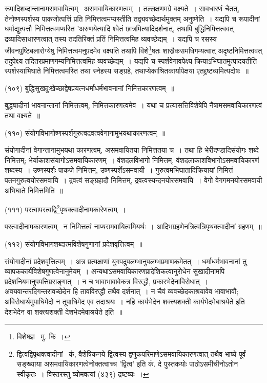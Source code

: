 \documentclass[11pt, openany]{book}
\begin{document}
{रूपादिशब्दान्तानामसमवायित्वम् \textendash\ असमवायिकारणत्वम्~। तल्लक्षणमग्रे वक्ष्यते~। सावधारणं चैतत्, तेनोष्णस्पर्शस्य पाकजोत्पत्तिं प्रति निमित्तत्वमप्यस्तीति तद्व्यवच्छेदार्थमुक्तम् अनुष्णेति~। यद्यपि च रूपादीनां धर्माद्युत्पत्तौ निमित्तत्वमप्यस्ति 'अरुणयेत्यादि श्वेतं छात्रमित्यादिदर्शनात्, तथापि बुद्धिनिमित्तत्ववत् द्रव्यादिसाधारणत्वात् तस्य तदतिरिक्तं प्रतिं निमित्तत्वमिह व्यवच्छेद्यम्~। यद्यपि च रसस्य जीवनपुष्टिबलारोग्येषु निमित्तत्वमनुपदमेव वक्ष्यति तथापि विशे\renewcommand{\thefootnote}{3}\footnote{विशेषज्ञ \textendash\ मु. कि~।}षतः शास्र्रैकसमधिगम्यत्वात् अदृष्टनिमित्तत्ववत् तदुपेक्ष्य तदितरप्रमाणगम्यनिमित्तत्वमिह व्यवच्छेद्यम्~। यद्यपि च स्पर्शवेगावपेक्ष्य क्रियाऽभिघातमुत्पादयतीति स्पर्शस्याभिघाते निमित्तत्वमस्ति तथा स्नेहस्य सङ्ग्रहे, तथाप्येकाश्रितकार्यापेक्षया एतद्द्रष्टव्यमित्यदोषः~॥

\hangindent=2cm {\knu (१०९) बुद्धिसुखदुःखेच्छाद्वेषप्रयत्नधर्माधर्मभावनानां निमित्तकारणत्वम्~॥}

बुद्ध्यादीनां भावनान्तानां निमित्तत्वम्, निमित्तकारणत्वमेव~। यथा च प्रत्यासत्तिविशेषेपि नैषामसमवायिकारणत्वं तथा वक्ष्यते~॥ 

\hangindent=2cm {\knu (११०) संयोगविभागोष्णस्पर्शगुरुत्वद्रवत्ववेगानामुभयथाकारणत्वम्~॥}

संयोगादीनां वेगान्तानामुभयथा कारणत्वम्, असमवायितया निमित्ततया च~। तथा हि भेरीदण्डादिसंयोगः शब्दे निमित्तम्; भेर्याकाशसंयागोऽसमवायिकारणम्~। वंशदलविभागो निमित्तम्, वंशदलाकाशविभागोऽसमवायिकारणं शब्दस्य~। उष्णस्पर्शः पाकजे निमित्तम्, उष्णस्पर्शेऽसमवायी~। गुरुत्वमभिघातादिक्रियायां निमित्तं पतनगुरुत्वयोरसमवायि~। द्रवत्वं सङ्ग्रहादौ निमित्तम्, द्रवत्वस्यन्दनयोरसमवायि~। वेगो वेगगमनयोरसमवायी अभिघाते निमित्तमिति~॥

\newpage
{\knu (१११) परत्वापरत्वद्वि\renewcommand{\thefootnote}{1}\footnote{द्वित्वद्विपृथक्त्वादीनां \textendash\ कं, वैशेषिकनये द्वित्वस्य द्वणुकपरिमाणेऽसमवायिकारणत्वात् तथैव भाष्ये पूर्वं सङ्ख्याया असमवायिकारणत्वेनोक्तत्वाच्च 'द्वित्व' इति कं. दे पुस्तकयोः पाठोऽसमीचीनोऽतोन स्वीकृतः~। विस्तरस्तु व्योमवत्यां (४३९) द्रष्टव्यः~।}पृथक्त्वादीनामकारेणत्वम्~।}

परत्वादीनामकारणत्वम् \textendash\ न निमित्तत्वं नाप्यसमवायित्वमियर्थः~। आदिभग्रहणेनत्रित्वत्रिपृथक्त्वादीनां ग्रहणम्~॥

\hangindent=2cm {\knu (११२) संयोगविभागशब्दात्मविशेषगुणानां प्रदेशवृत्तित्वम्~॥}

संयोगादीनां प्रदेशवृत्तित्वम्~। अत्र प्रत्यक्षाणां युगपदुपलम्भानुपलम्भप्रमाणकमेतत्~। धर्माधर्मभावनानां तु व्यापककार्यविशेषगुणत्वेनानुमेयम्~। अन्यथाऽसमवायिकारणप्रादेशिकत्वानुरोधेन सुखादीनामपि प्रदेशनियमानुपपत्तिप्रसङ्गात्~। न च भावाभावावेकत्र विरुद्धौ, प्रकारभेदेनाविरोधात्~। अवयवान्तरदिगन्तरावच्छेदेन हि तावविरुद्धौ तथैव दर्शनात्~। न चैवं व्यवच्छेदकाश्रयावेव भावाभावौ; अविरोधार्थमुपाधिमेदो न तूपाधिमेद एव तदाश्रयः~। नहि कार्यभेदेन शक्त्यशक्ती कार्यभेदमेबाश्रयेते इति देशभेदेन वा शक्त्यशक्ती देशभेदमेवाश्रयेते इति~॥

}
\end{document}

